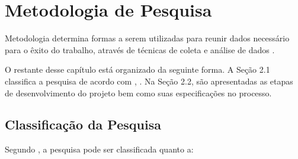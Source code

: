 \chapter{Metodologia de Pesquisa}
\label{cap:metodologiapesquisa}

Metodologia determina formas a serem utilizadas para reunir dados necessário para o êxito do trabalho, através de técnicas de coleta e análise de dados \cite{moresi2003metodologia}. 

O restante desse capítulo está organizado da seguinte forma. A Seção 2.1 classifica a pesquisa de acordo com \citeauthor{moresi2003metodologia}, \citeyear{moresi2003metodologia}. Na Seção 2.2, são apresentadas as etapas de desenvolvimento do projeto bem como suas especificações no processo. 

\section{Classificação da Pesquisa}

Segundo \citeauthor{moresi2003metodologia} \citeyear{moresi2003metodologia}, a pesquisa pode ser classificada quanto a:

